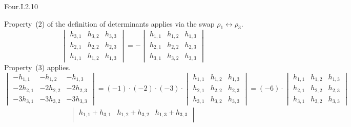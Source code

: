 \begin{ans}{Four.I.2.10}
      \begin{exparts}
        \partsitem Property~(2) of the definition of determinants
          applies via the swap $\rho_1\leftrightarrow\rho_3$.
          \begin{equation*}
            \begin{vmatrix}
              h_{3,1}  &h_{3,2} &h_{3,3} \\
              h_{2,1}  &h_{2,2} &h_{2,3} \\
              h_{1,1}  &h_{1,2} &h_{1,3}
            \end{vmatrix}
            =
            -\begin{vmatrix}
              h_{1,1}  &h_{1,2} &h_{1,3} \\
              h_{2,1}  &h_{2,2} &h_{2,3} \\
              h_{3,1}  &h_{3,2} &h_{3,3}
            \end{vmatrix}
          \end{equation*}
        \partsitem Property~(3) applies.
          \begin{equation*}
            \begin{vmatrix}
             -h_{1,1}   &-h_{1,2}  &-h_{1,3} \\
             -2h_{2,1}  &-2h_{2,2} &-2h_{2,3} \\
             -3h_{3,1}  &-3h_{3,2} &-3h_{3,3}
            \end{vmatrix}
            =
            (-1)\cdot(-2)\cdot(-3)\cdot
            \begin{vmatrix}
             h_{1,1}   &h_{1,2}  &h_{1,3} \\
             h_{2,1}   &h_{2,2}  &h_{2,3} \\
             h_{3,1}   &h_{3,2}  &h_{3,3}
            \end{vmatrix}
            =
            (-6)\cdot
            \begin{vmatrix}
             h_{1,1}   &h_{1,2}  &h_{1,3} \\
             h_{2,1}   &h_{2,2}  &h_{2,3} \\
             h_{3,1}   &h_{3,2}  &h_{3,3}
            \end{vmatrix}
          \end{equation*}
        \partsitem
          \begin{align*}
          \begin{vmatrix}
            h_{1,1}+h_{3,1}  &h_{1,2}+h_{3,2} &h_{1,3}+h_{3,3} \\

\end{vmatrix}
\end{align*}
\end{exparts}
\end{ans}

